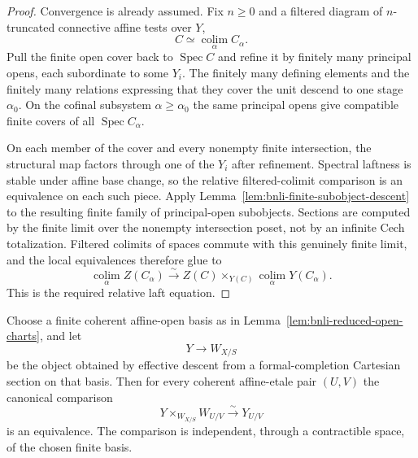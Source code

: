 \begin{proof}
Convergence is already assumed.  Fix $n\ge0$ and a filtered diagram of
$n$-truncated connective affine tests over $Y$,
\[
    C\simeq\operatorname*{colim}_\alpha C_\alpha.
\]
Pull the finite open cover back to $\operatorname{Spec}C$ and refine it by
finitely many principal opens, each subordinate to some $Y_i$.  The finitely
many defining elements and the finitely many relations expressing that they
cover the unit descend to one stage $\alpha_0$.  On the cofinal subsystem
$\alpha\ge\alpha_0$ the same principal opens give compatible finite covers of
all $\operatorname{Spec}C_\alpha$.

On each member of the cover and every nonempty finite intersection, the
structural map factors through one of the $Y_i$ after refinement.  Spectral
laftness is stable under affine base change, so the relative filtered-colimit
comparison is an equivalence on each such piece.  Apply
Lemma~\ref{lem:bnli-finite-subobject-descent} to the resulting finite family
of principal-open subobjects.  Sections are computed by the finite limit over
the nonempty intersection poset, not by an infinite Cech totalization.
Filtered colimits of spaces commute with this genuinely finite limit, and the
local equivalences therefore glue to
\[
    \operatorname*{colim}_\alpha Z(C_\alpha)
    \xrightarrow{\sim}
    Z(C)\times_{Y(C)}
    \operatorname*{colim}_\alpha Y(C_\alpha).
\]
This is the required relative laft equation.
\end{proof}

\begin{lemma}
\label{lem:bnli-basis-recovery}
Choose a finite coherent affine-open basis as in
Lemma~\ref{lem:bnli-reduced-open-charts}, and let
\[
    Y\longrightarrow W_{X/S}
\]
be the object obtained by effective descent from a formal-completion Cartesian
section on that basis.  Then for every coherent affine-etale pair $(U,V)$ the
canonical comparison
\[
\boxed{
    Y\times_{W_{X/S}}W_{U/V}
    \xrightarrow{\sim}
    Y_{U/V}}
\]
is an equivalence.  The comparison is independent, through a contractible
space, of the chosen finite basis.
\end{lemma}

